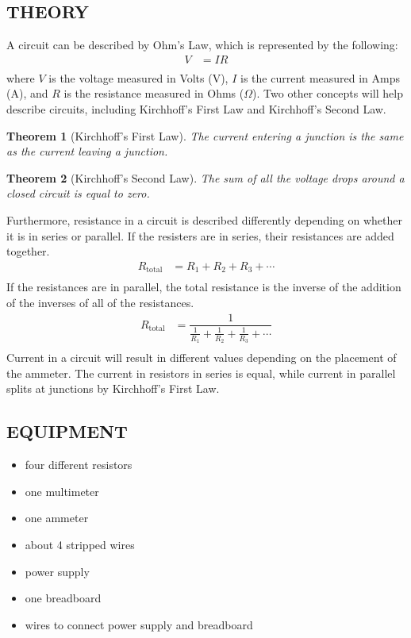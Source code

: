 \documentclass [12pt, letterpaper, twoside] {article}
\newtheorem{theorem}{Theorem}
\begin{document}
\subsection* {THEORY}
\noindent
A circuit can be described by Ohm's Law, which is represented by the following:
\begin{equation}
  \begin{split}
    V &= IR \\
  \end{split}
\end{equation}
where \(V\) is the voltage measured in Volts (V), \(I\) is the current measured in Amps (A), and \(R\) is the resistance measured in Ohms (\(\Omega\)). Two other concepts will help describe circuits, including Kirchhoff's First Law and Kirchhoff's Second Law.
\begin{theorem}[Kirchhoff's First Law]
  The current entering a junction is the same as the current leaving a junction.
\end{theorem}
\begin{theorem}[Kirchhoff's Second Law]
  The sum of all the voltage drops around a closed circuit is equal to zero.
\end{theorem}
Furthermore, resistance in a circuit is described differently depending on whether it is in series or parallel. If the resisters are in series, their resistances are added together.
\begin{equation}
  \begin{split}
    R_{\text{total}} &= R_{1} + R_{2} + R_{3} + \cdots \\
  \end{split}
\end{equation}
If the resistances are in parallel, the total resistance is the inverse of the addition of the inverses of all of the resistances.
\begin{equation}
  \begin{split}
    R_{\text{total}} &= \dfrac{1}{\tfrac{1}{R_{1}} + \tfrac{1}{R_{2}} + \tfrac{1}{R_{3}} + \cdots} \\
  \end{split}
\end{equation}
Current in a circuit will result in different values depending on the placement of the ammeter. The current in resistors in series is equal, while current in parallel splits at junctions by Kirchhoff's First Law. 

\subsection* {EQUIPMENT}
  \noindent
  \begin {itemize}
    \itemsep0em
    \item {four different resistors}
    \item {one multimeter}
    \item {one ammeter}
    \item {about 4 stripped wires}
    \item {power supply}
    \item {one breadboard}
    \item {wires to connect power supply and breadboard}
  \end {itemize}
\end{document}

